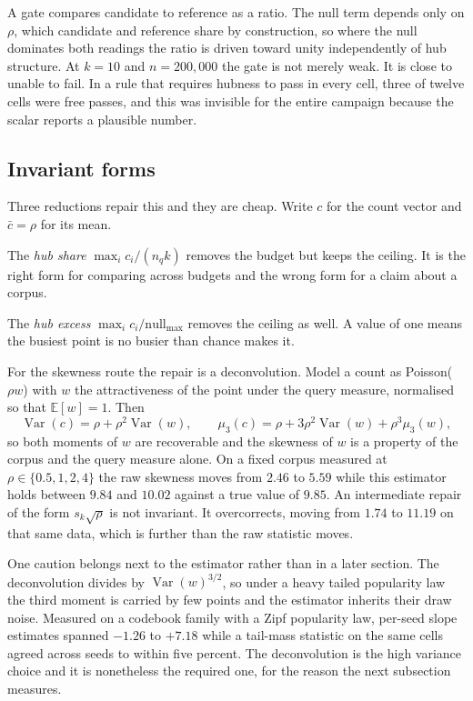 \documentclass[11pt]{article}
\begin{document}
A gate compares candidate to reference as a ratio. The null term depends only
on $\rho$, which candidate and reference share by construction, so where the
null dominates both readings the ratio is driven toward unity independently
of hub structure. At $k = 10$ and $n = 200{,}000$ the gate is not merely
weak. It is close to unable to fail. In a rule that requires hubness to pass
in every cell, three of twelve cells were free passes, and this was invisible
for the entire campaign because the scalar reports a plausible number.

\subsection{Invariant forms}

Three reductions repair this and they are cheap. Write $c$ for the count
vector and $\bar c = \rho$ for its mean.

The \emph{hub share} $\max_i c_i / (n_q k)$ removes the budget but keeps the
ceiling. It is the right form for comparing across budgets and the wrong form
for a claim about a corpus.

The \emph{hub excess} $\max_i c_i / \mathrm{null}_{\max}$ removes the ceiling
as well. A value of one means the busiest point is no busier than chance
makes it.

For the skewness route the repair is a deconvolution. Model a count as
Poisson($\rho w$) with $w$ the attractiveness of the point under the query
measure, normalised so that $\mathbb{E}[w] = 1$. Then
\[
\operatorname{Var}(c) = \rho + \rho^2 \operatorname{Var}(w), \qquad
\mu_3(c) = \rho + 3\rho^2 \operatorname{Var}(w) + \rho^3 \mu_3(w),
\]
so both moments of $w$ are recoverable and the skewness of $w$ is a property
of the corpus and the query measure alone. On a fixed corpus measured at
$\rho \in \{0.5, 1, 2, 4\}$ the raw skewness moves from $2.46$ to $5.59$
while this estimator holds between $9.84$ and $10.02$ against a true value of
$9.85$. An intermediate repair of the form $s_k \sqrt{\rho}$ is not
invariant. It overcorrects, moving from $1.74$ to $11.19$ on that same data,
which is further than the raw statistic moves.

One caution belongs next to the estimator rather than in a later section. The
deconvolution divides by $\operatorname{Var}(w)^{3/2}$, so under a heavy
tailed popularity law the third moment is carried by few points and the
estimator inherits their draw noise. Measured on a codebook family with a
Zipf popularity law, per-seed slope estimates spanned $-1.26$ to $+7.18$
while a tail-mass statistic on the same cells agreed across seeds to within
five percent. The deconvolution is the high variance choice and it is
nonetheless the required one, for the reason the next subsection measures.
\end{document}
